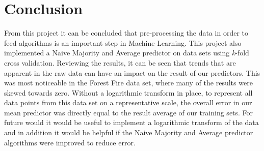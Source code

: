 \documentclass[twoside,11pt]{article}
\begin{document}
\section{Conclusion}
From this project it can be concluded that pre-processing the data in order to feed algorithms is an important step in Machine Learning. This project also implemented a Naive Majority and Average predictor on data sets using \textit{k}-fold cross validation. Reviewing the results, it can be seen that trends that are apparent in the raw data can have an impact on the result of our predictors. This was most noticeable in the Forest Fire data set, where many of the results were skewed towards zero. Without a logarithmic transform in place, to represent all data points from this data set on a representative scale, the overall error in our mean predictor was directly equal to the result average of our training sets. For future would it would be useful to implement a logarithmic transform of the data and in addition it would be helpful if the Naive Majority and Average predictor algorithms were improved to reduce error. 

\newpage
\end{document}
